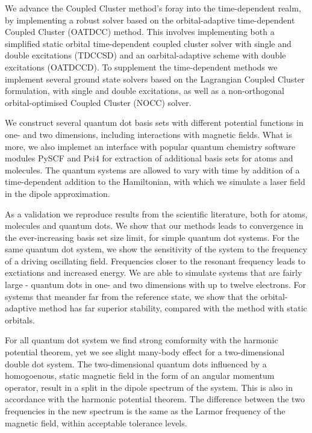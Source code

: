 We advance the Coupled Cluster method's foray into the time-dependent realm, 
by implementing a robust solver based on the orbital-adaptive time-dependent 
Coupled Cluster (OATDCC)\cite{kvaal2012ab} method.
This involves implementing both a simplified static
orbital time-dependent coupled cluster solver with single and double excitations 
(TDCCSD) and an oarbital-adaptive scheme with double excitations (OATDCCD).
To supplement the time-dependent methods we implement several ground state 
solvers based on the Lagrangian Coupled Cluster formulation, with single and double 
excitations, as well as a non-orthogonal orbital-optimised Coupled Cluster (NOCC)
solver\cite{myhre2018demonstrating}.

We construct several quantum dot basis sets with different potential functions
in one- and two dimensions, including interactions with magnetic fields.
What is more, we also implemet an 
interface with popular quantum chemistry software modules PySCF\cite{PYSCF}
and Psi4\cite{parrish2017psi4} for extraction of additional 
basis sets for atoms and molecules. The quantum systems are allowed to vary with time 
by addition of a time-dependent addition to the Hamiltonian, with which we simulate 
a laser field in the dipole approximation.

As a validation we reproduce results from the scientific literature, both for 
atoms, molecules and quantum dots. We show that our methods leads to convergence in 
the ever-increasing basis set size limit, for simple quantum dot systems. For the 
same quantum dot system, we show the sensitivity of the system to the frequency of 
a driving oscillating field. Frequencies closer to the resonant frequency 
leads to exctiations and increased energy. We are able to simulate systems that 
are fairly large - quantum dots in one- and two dimensions with up to twelve 
electrons. For systems that meander far from the reference state, we show that 
the orbital-adaptive method has far superior stability, compared with the 
method with static orbitals.

For all quantum dot system we find 
strong comformity with the harmonic potential theorem\cite{kohn1961cyclotron},
yet we see slight many-body 
effect for a two-dimensional double dot system. The two-dimensional quantum dots 
influenced by a homogoenous, static magnetic field in the form of an angular 
momentum operator, result in a split in the dipole spectrum of the system. This
is also in accordance with the harmonic potential theorem.
The difference between the two frequencies in the new spectrum is the same as the
Larmor frequency of the magnetic field, within acceptable tolerance levels. 